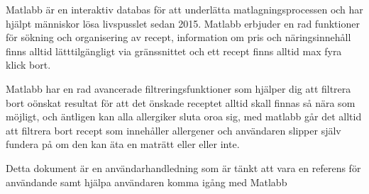 Matlabb är en interaktiv databas för att underlätta
matlagningsprocessen och har hjälpt människor lösa livspusslet sedan
2015. Matlabb erbjuder en rad funktioner för sökning och organisering
av recept, information om pris och näringsinnehåll finns alltid
lätttilgängligt via gränssnittet och ett recept finns alltid max fyra
klick bort.

Matlabb har en rad avancerade filtreringsfunktioner som hjälper dig
att filtrera bort oönskat resultat för att det önskade receptet alltid
skall finnas så nära som möjligt, och äntligen kan alla allergiker
sluta oroa sig, med matlabb går det alltid att filtrera bort recept
som innehåller allergener och användaren slipper själv fundera på om
den kan äta en maträtt eller eller inte.

Detta dokument är en användarhandledning som är tänkt att vara en
referens för användande samt hjälpa användaren komma igång med Matlabb
